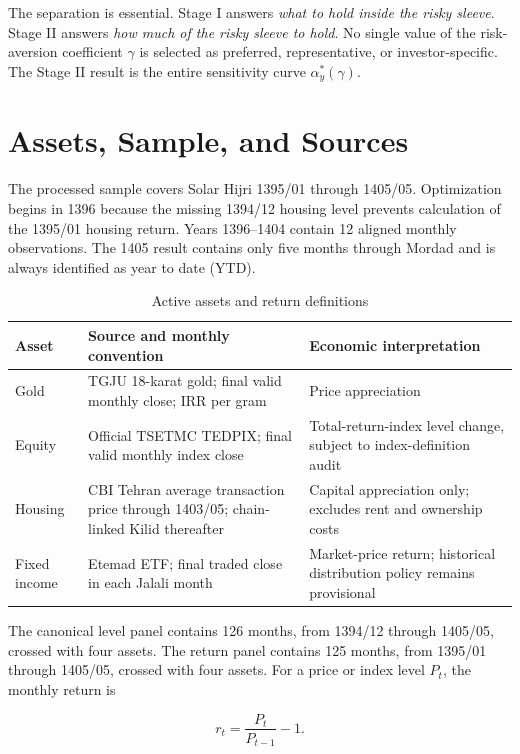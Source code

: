 \documentclass[11pt,a4paper]{article}
\begin{document}
The separation is essential. Stage I answers \emph{what to hold inside the risky sleeve}.
Stage II answers \emph{how much of the risky sleeve to hold}. No single value of the risk-aversion
coefficient $\gamma$ is selected as preferred, representative, or investor-specific. The Stage II
result is the entire sensitivity curve $\alpha_y^*(\gamma)$.

\section{Assets, Sample, and Sources}

The processed sample covers Solar Hijri 1395/01 through 1405/05. Optimization begins in 1396
because the missing 1394/12 housing level prevents calculation of the 1395/01 housing return.
Years 1396--1404 contain 12 aligned monthly observations. The 1405 result contains only five
months through Mordad and is always identified as year to date (YTD).

\begin{table}[ht]
\centering
\caption{Active assets and return definitions}
\begin{tabular}{p{2.5cm}p{5.4cm}p{5.2cm}}
\toprule
Asset & Source and monthly convention & Economic interpretation \\
\midrule
Gold & TGJU 18-karat gold; final valid monthly close; IRR per gram
& Price appreciation \\
Equity & Official TSETMC TEDPIX; final valid monthly index close
& Total-return-index level change, subject to index-definition audit \\
Housing & CBI Tehran average transaction price through 1403/05;
chain-linked Kilid thereafter & Capital appreciation only; excludes rent and ownership costs \\
Fixed income & Etemad ETF; final traded close in each Jalali month
& Market-price return; historical distribution policy remains provisional \\
\bottomrule
\end{tabular}
\end{table}

The canonical level panel contains 126 months, from 1394/12 through 1405/05, crossed with four
assets. The return panel contains 125 months, from 1395/01 through 1405/05, crossed with four
assets. For a price or index level $P_t$, the monthly return is

\begin{equation}
r_t=\frac{P_t}{P_{t-1}}-1.
\end{equation}
\end{document}
